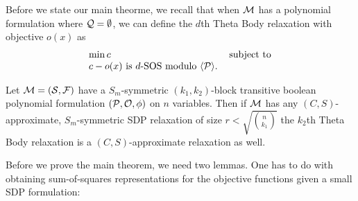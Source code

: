 Before we state our main theorme, we recall that when $\mathcal M$ has a polynomial formulation where $\mathcal Q = \emptyset$, we can define the $d$th Theta Body relaxation with objective $o(x)$ as 
\[\begin{tabular}{ll} $\min c$ & subject to \\ $c - o(x)$ is $d$-SOS modulo $\gen{\cP}$.\end{tabular}\] 
\begin{theorem}\label{thm:symmetric-main}
Let $\mathcal M = (\mathcal S, \mathcal F)$ have a $S_m$-symmetric $(k_1,k_2)$-block transitive boolean polynomial formulation $(\mathcal P, \mathcal O, \phi)$ on $n$ variables. Then if $\mathcal M$ has any $(C,S)$-approximate, $S_m$-symmetric SDP relaxation of size $r < \sqrt{\binom{n}{k_1}}$ the $k_2$th Theta Body relaxation is a $(C,S)$-approximate relaxation as well.
\end{theorem}
Before we prove the main theorem, we need two lemmas. One has to do with obtaining sum-of-squares representations for the objective functions given a small SDP formulation:

